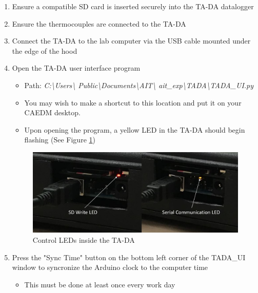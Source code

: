 \documentclass[letterpaper,11pt]{article}
\begin{document}
\begin{enumerate}
\begin{itemize}
        \end{itemize}
    
    \item Ensure a compatible SD card is inserted securely into the TA-DA 
        datalogger
    \item Ensure the thermocouples are connected to the TA-DA

    \item Connect the TA-DA to the lab computer via the USB cable mounted 
        under the edge of the hood
    
    \item Open the TA-DA user interface program 
            \begin{itemize}
            \item Path: \textit{C:\textbackslash Users\textbackslash  
                Public\textbackslash Documents\textbackslash AIT\textbackslash 
                ait_exp\textbackslash TADA\textbackslash TADA\_UI.py}
            \item You may wish to make a shortcut to this location and put it on 
                your CAEDM desktop.
            \item Upon opening the program, a yellow LED in the TA-DA should 
                begin flashing (See Figure \ref{fig:tada_leds})
            \end{itemize}

\begin{figure}[H]
\centering
\includegraphics[width=.75\textwidth]{led_red_yellow.jpg}
\caption{Control LEDs inside the TA-DA}
\label{fig:tada_leds}
\end{figure}
    
    \item Press the "Sync Time" button on the bottom left corner of the TADA\_UI
        window to syncronize the Arduino clock to the computer time
        \begin{itemize}
        \item This must be done at least once every work day
        \end{itemize}
        

\end{enumerate}
\end{document}
